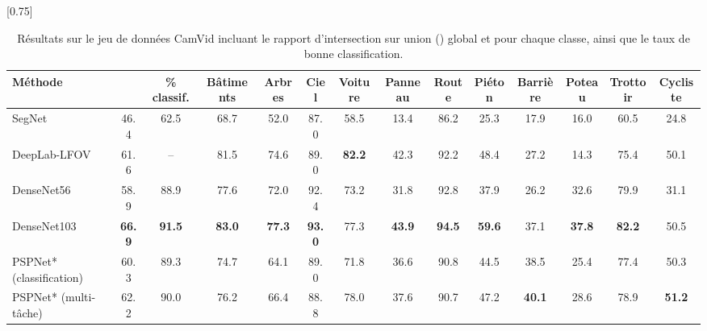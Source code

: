 \begin{table}[!t]
\setlength{\tabcolsep}{1pt}
\scalebox{0.75}[0.75]{
\begin{tabularx}{1.35\textwidth}{Y c c c c c c c c c c c c c}
\toprule
Méthode &  & \% classif. & Bâtiments & Arbres & Ciel & Voiture & Panneau & Route & Piéton & Barrière & Poteau & Trottoir & Cycliste\\
\midrule
SegNet~\cite{badrinarayanan_segnet_2017} & 46.4 & 62.5 & 68.7 & 52.0 & 87.0 & 58.5 & 13.4 & 86.2 & 25.3 & 17.9 & 16.0 & 60.5 & 24.8\\
DeepLab-LFOV~\cite{l._c._chen_deeplab_2018} & 61.6 & -- & 81.5 & 74.6 & 89.0 & \textbf{82.2} & 42.3 & 92.2 & 48.4 & 27.2 & 14.3 & 75.4 & 50.1\\
DenseNet56~\cite{jegou_one_2017} & 58.9 & 88.9 & 77.6 & 72.0 & 92.4 & 73.2 & 31.8 & 92.8 & 37.9 & 26.2 & 32.6 & 79.9 & 31.1\\
DenseNet103~\cite{jegou_one_2017} & \textbf{66.9} & \textbf{91.5} & \textbf{83.0} & \textbf{77.3} & \textbf{93.0} & 77.3 & \textbf{43.9} & \textbf{94.5} & \textbf{59.6} & 37.1 & \textbf{37.8} & \textbf{82.2} & 50.5\\
\midrule
PSPNet* (classification) & 60.3 & 89.3 & 74.7 & 64.1 & 89.0 & 71.8 & 36.6 & 90.8 & 44.5 & 38.5 & 25.4 & 77.4 & 50.3\\
PSPNet* (multi-tâche) & 62.2 & 90.0 & 76.2 & 66.4 &  88.8 & 78.0 & 37.6 & 90.7 & 47.2 & \textbf{40.1} & 28.6 & 78.9 & \textbf{51.2}\\
\bottomrule
\end{tabularx}}
\caption{Résultats sur le jeu de données CamVid incluant le rapport d'intersection sur union () global et pour chaque classe, ainsi que le taux de bonne classification.}
\label{tab:camvid_results}
\end{table}

